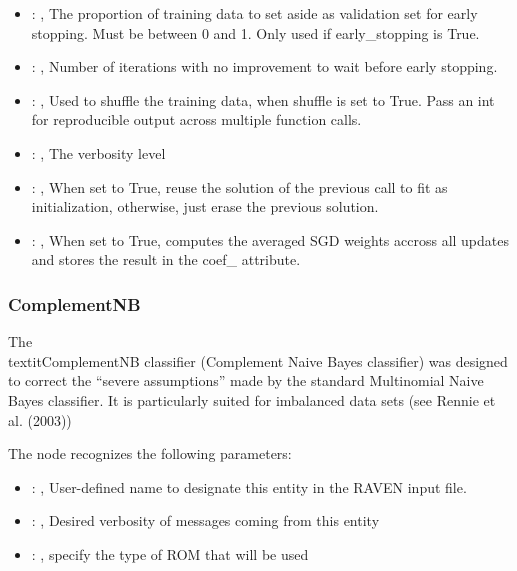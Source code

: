 \begin{itemize}
    \item {}: , 
      The proportion of training data to set aside as validation set for early stopping.
      Must be between 0 and 1. Only used if early\_stopping is True.

    \item {}: , 
      Number of iterations with no improvement to wait before early stopping.

    \item {}: , 
      Used to shuffle the training data, when shuffle is set to
      True. Pass an int for reproducible output across multiple function calls.

    \item {}: , 
      The verbosity level

    \item {}: , 
      When set to True, reuse the solution of the previous call
      to fit as initialization, otherwise, just erase the previous solution.

    \item {}: , 
      When set to True, computes the averaged SGD weights accross
      all updates and stores the result in the coef\_ attribute.
  \end{itemize}


\subsubsection{ComplementNB}
  The \\textit{ComplementNB} classifier (Complement Naive Bayes classifier) was designed to correct
  the ``severe assumptions'' made by the standard Multinomial Naive Bayes classifier.
  It is particularly suited for imbalanced data sets (see Rennie et al. (2003))

  The  node recognizes the following parameters:
    \begin{itemize}
      \item {}: , 
        User-defined name to designate this entity in the RAVEN input file.
      \item {}: , 
        Desired verbosity of messages coming from this entity
      \item {}: , 
        specify the type of ROM that will be used
  \end{itemize}

